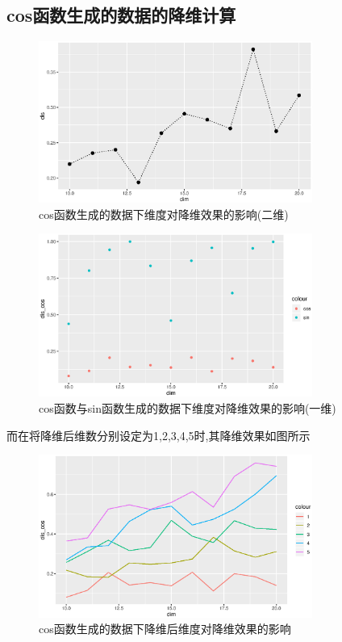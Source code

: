 \subsection{cos函数生成的数据的降维计算}
\begin{figure}[htbp]
    \centering
    \includegraphics[width=0.8\textwidth]{image/cos_save.eps}
    \caption{cos函数生成的数据下维度对降维效果的影响(二维)}
\end{figure}

\begin{figure}[htbp]
    \centering
    \includegraphics[width=0.8\textwidth]{image/compare_save_one.eps}
    \caption{cos函数与sin函数生成的数据下维度对降维效果的影响(一维)}
\end{figure}

而在将降维后维数分别设定为1,2,3,4,5时,其降维效果如图所示
\begin{figure}[htbp]
    \centering
    \includegraphics[width=0.8\textwidth]{image/compare_dim_save.eps}
    \caption{cos函数生成的数据下降维后维度对降维效果的影响}
\end{figure}

